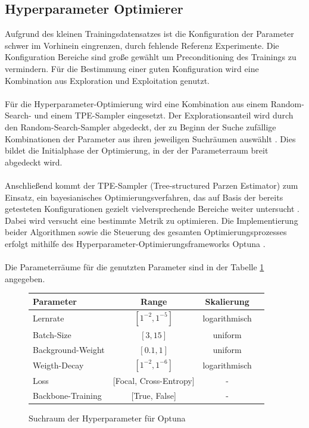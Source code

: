 \documentclass[12pt,DIV=15,BCOR=15mm,twoside,headsepline,abstract=true,listof=totoc,bibliography=totoc]{scrreprt}
\theoremstyle{remark}    %
\begin{document}
    \subsection{Hyperparameter Optimierer}
    Aufgrund des kleinen Trainingsdatensatzes ist die Konfiguration der Parameter schwer im Vorhinein eingrenzen, durch fehlende Referenz Experimente.
    Die Konfiguration Bereiche sind große gewählt um Preconditioning des Trainings zu vermindern. Für die Bestimmung einer guten Konfiguration wird
    eine Kombination aus Exploration und Exploitation genutzt.\\\\
    Für die Hyperparameter-Optimierung wird eine Kombination aus einem Random-Search- und einem TPE-Sampler eingesetzt.
    Der Explorationsanteil wird durch den Random-Search-Sampler abgedeckt, der zu Beginn der Suche zufällige Kombinationen der Parameter aus ihren jeweiligen 
    Suchräumen auswählt \cite{akiba2019optunanextgenerationhyperparameteroptimization}. Dies bildet die Initialphase der Optimierung, in der der Parameterraum breit 
    abgedeckt wird. \\\\
    Anschließend kommt der TPE-Sampler (Tree-structured Parzen Estimator) zum Einsatz, ein bayesianisches Optimierungsverfahren, das auf Basis der bereits 
    getesteten Konfigurationen gezielt vielversprechende Bereiche weiter untersucht \cite{watanabe2023treestructuredparzenestimatorunderstanding}. 
    Dabei wird versucht eine bestimmte Metrik zu optimieren.
    Die Implementierung beider Algorithmen sowie die Steuerung des gesamten Optimierungsprozesses erfolgt mithilfe des Hyperparameter-Optimierungsframeworks 
    Optuna \cite{akiba2019optunanextgenerationhyperparameteroptimization}.\\\\
    Die Parameterräume für die genutzten Parameter sind in der Tabelle \ref{tab:pram_sear} angegeben.

    \begin{figure}[h] 
    \centering
    \begin{tabular}{l*{3}{c}}
    \toprule
    \textbf{Parameter} & \textbf{Range} & \textbf{Skalierung}\\
    \midrule
        Lernrate &  $[1^{-2}, 1^{-5}]$& logarithmisch \\
        Batch-Size& $[3, 15]$& uniform\\
        Background-Weight& $[0.1, 1]$ & uniform\\
        Weigth-Decay& $[1^{-2}, 1^{-6}]$  & logarithmisch \\
        Loss & [Focal, Cross-Entropy] & -\\
        Backbone-Training & [True, False] & -\\
    \bottomrule
    \end{tabular}
    \caption{Suchraum der Hyperparameter für Optuna}
    \label{tab:pram_sear}
    \end{figure}
\end{document}
